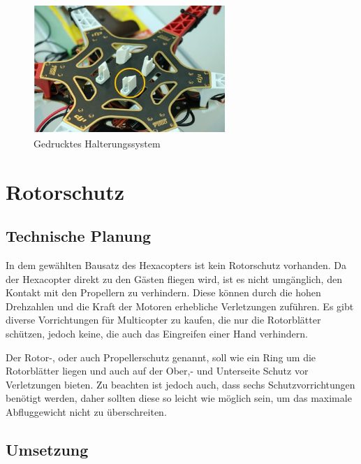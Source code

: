			\begin{figure}[tbh]
			\begin{centering}
			\includegraphics[width = 0.65\textwidth]{Bilder/halterung_cupcake_fertig_hinweis}
			\par\end{centering}
			\caption{Gedrucktes Halterungssystem}
			\label{halterung_cupcake_fertig_hinweis}
			\end{figure}

			\newpage

\section{Rotorschutz}

	\subsection{Technische Planung}

	In dem gewählten Bausatz des Hexacopters ist kein Rotorschutz vorhanden.
	Da der Hexacopter direkt zu den Gästen fliegen wird, ist es nicht umgänglich, den Kontakt mit den Propellern zu verhindern.
	Diese können durch die hohen Drehzahlen und die Kraft der Motoren erhebliche Verletzungen zuführen.
	Es gibt diverse Vorrichtungen für Multicopter zu kaufen, die nur die Rotorblätter schützen, jedoch keine, die auch das Eingreifen einer Hand verhindern.

	Der Rotor-, oder auch Propellerschutz genannt, soll wie ein Ring um die Rotorblätter liegen und auch auf der Ober,- und Unterseite Schutz vor Verletzungen bieten.
	Zu beachten ist jedoch auch, dass sechs Schutzvorrichtungen benötigt werden, daher sollten diese so leicht wie möglich sein, um das maximale Abfluggewicht nicht zu überschreiten.

	\subsection{Umsetzung}

